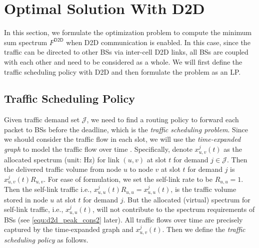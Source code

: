 \section{Optimal Solution With D2D} \label{sec:optimal_d2d}
In this section, we formulate the optimization problem to compute
the minimum sum spectrum $F^{\textsf{D2D}}$ when D2D communication
is enabled. In this case, since the traffic can be directed
to other BSs via inter-cell D2D links, all BSs are coupled with
each other and need to be considered as a whole. We will first
define the traffic scheduling policy with D2D and then formulate
the problem as an LP.



\subsection{Traffic Scheduling Policy} \label{sec:traffic}
Given traffic demand set $\mathcal{J}$, we need to find a routing policy to
forward each packet to BSs before the deadline, which is the
\emph{traffic scheduling problem}.
Since we should consider the traffic flow in each slot,
we will use the \emph{time-expanded graph} to model the traffic flow over time \cite{Skutella09}.
Specifically, denote $x_{u,v}^{j}(t)$ as the allocated
spectrum (unit: Hz) for link $(u,v)$ at slot $t$ for demand $j \in \mathcal{J}$.
Then the delivered traffic volume from node $u$ to node $v$ at slot $t$ for demand $j$
is $x_{u,v}^{j}(t) R_{u,v}$.
For ease of formulation, we set the self-link rate to be $R_{u,u}=1$.
Then the self-link traffic
i.e., $x_{u,u}^{j}(t)R_{u,u}=x_{u,u}^{j}(t)$,
is the traffic volume stored in node $u$ at slot $t$ for demand $j$.
But the allocated (virtual) spectrum for self-link traffic, i.e., $x_{u,u}^{j}(t)$, will
not contribute to the spectrum requirements of BSs (see \eqref{equ:d2d_peak_cons2} later).
All traffic flows over time are precisely captured by
the time-expanded graph and $x_{u,v}^{j}(t)$.
Then we  define the \emph{traffic scheduling policy} as follows.
